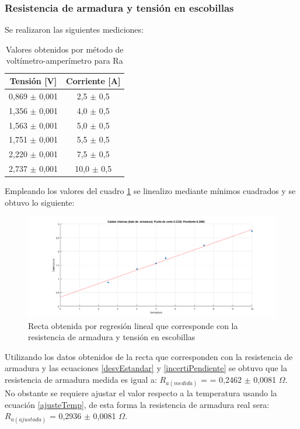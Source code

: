 \documentclass[11pt,letterpaper]{article}     %
\begin{document}
\subsubsection{Resistencia de armadura y tensión en escobillas}
Se realizaron las siguientes mediciones:
\begin{table}[H]
	\centering
	\caption{Valores obtenidos por método de voltímetro-amperímetro para Ra}
	\label{VoltimetroAmperimetroRA}
	\begin{tabular}{|c|c|}
		\hline
		\textbf{Tensión {[}V{]}} & \textbf{Corriente {[}A{]}} \\ \hline
		0,869 $\pm$ 0,001            & 2,5 $\pm$ 0,5            \\ \hline
		1,356 $\pm$ 0,001            & 4,0 $\pm$ 0,5            \\ \hline
		1,563 $\pm$ 0,001            & 5,0 $\pm$ 0,5            \\ \hline
		1,751 $\pm$ 0,001            & 5,5 $\pm$ 0,5            \\ \hline
		2,220 $\pm$ 0,001            & 7,5 $\pm$ 0,5             \\ \hline
		2,737 $\pm$ 0,001            & 10,0 $\pm$ 0,5             \\ \hline
	\end{tabular}
\end{table}
Empleando los valores del cuadro \ref{VoltimetroAmperimetroRA} se linealizo mediante mínimos cuadrados y se obtuvo lo siguiente:
\begin{figure}[H]
	\centering
	\includegraphics[scale=0.5]{./recursos-Lab6/caidasInternasARMADURA.png}
	\caption{Recta obtenida por regresión lineal que corresponde con la resistencia de armadura y tensión en escobillas}
	\label{fig:rectaResistenciaArmadura}
\end{figure}
Utilizando los datos obtenidos de la recta que corresponden con la resistencia de armadura y las ecuaciones \ref{desvEstandar} y \ref{incertiPendiente} se obtuvo que la resistencia de armadura medida es igual a: $R_{a(medida)}$ = = 0,2462 $\pm$ 0,0081 $\Omega$. No obstante se requiere ajustar el valor respecto a la temperatura usando la ecuación \ref{ajusteTemp}, de esta forma la resistencia de armadura real sera: $R_{a(ajustada)}$ = 0,2936 $\pm$ 0,0081 $\Omega$.
\end{document}
